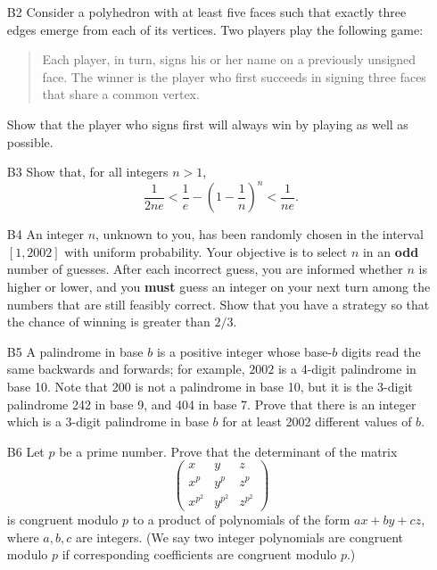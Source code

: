 \documentclass[amssymb,twocolumn,pra,10pt,aps]{revtex4-1}
\begin{document}
\begin{itemize}
\item[B2]
Consider a polyhedron with at least five faces such that exactly three
edges emerge from each of its vertices. Two players play the following
game:
\begin{verse}
\noindent
Each player, in turn, signs his or her name on a previously
unsigned face. The winner is the player who first succeeds in
signing three faces that share a common vertex.
\end{verse}
Show that the player who signs first will always win by playing
as well as possible.

\item[B3]
Show that, for all integers $n > 1$,
\[
\frac{1}{2ne} < \frac{1}{e} - \left( 1 - \frac{1}{n} \right)^n
< \frac{1}{ne}.
\]

\item[B4]
An integer $n$, unknown to you, has been randomly chosen in the
interval $[1, 2002]$ with uniform probability. Your objective is
to select $n$ in an \textbf{odd} number of guesses. After
each incorrect guess, you are informed whether $n$ is higher
or lower, and you \textbf{must} guess an integer on your next turn
among the numbers that are still feasibly correct. Show that you
have a strategy so that the chance of winning is greater than $2/3$.

\item[B5]
A palindrome in base $b$ is a positive integer whose base-$b$
digits read the same backwards and forwards; for example,
$2002$ is a 4-digit palindrome in base 10. Note that 200 is not
a palindrome in base 10, but it is the 3-digit palindrome
242 in base 9, and 404 in base 7. Prove that there is an integer
which is a 3-digit palindrome in base $b$ for at least 2002
different values of $b$.

\item[B6]
Let $p$ be a prime number. Prove that the determinant of the matrix
\[
\begin{pmatrix}
x & y & z \\
x^p & y^p & z^p \\
x^{p^2} & y^{p^2} & z^{p^2}
\end{pmatrix}
\]
is congruent modulo $p$ to a product of polynomials of the form
$ax+by+cz$, where $a,b,c$ are integers. (We say two integer
polynomials are congruent modulo $p$ if corresponding coefficients
are congruent modulo $p$.)

\end{itemize}
\end{document}
